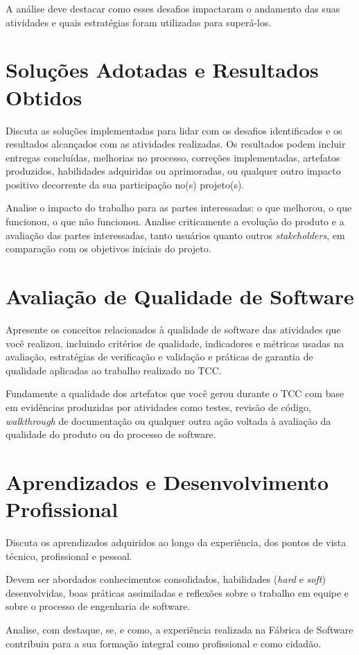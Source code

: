 A análise deve destacar como esses desafios impactaram o andamento das suas atividades e quais estratégias foram utilizadas para superá-los.

\section{Soluções Adotadas e Resultados Obtidos}

Discuta as soluções implementadas para lidar com os desafios identificados e os resultados alcançados com as atividades realizadas. 
Os resultados podem incluir entregas concluídas, melhorias no processo, correções implementadas, artefatos produzidos, habilidades adquiridas ou aprimoradas, ou qualquer outro impacto positivo decorrente da sua participação no(s) projeto(s).

Analise o impacto do trabalho para as partes interessadas: o que melhorou, o que funcionou, o que não funcionou.
Analise criticamente a evolução do produto e a avaliação das partes interessadas, tanto usuários quanto outros \textit{stakeholders}, em comparação com os objetivos iniciais do projeto.

\section{Avaliação de Qualidade de Software}

Apresente os conceitos relacionados à qualidade de software das atividades que você realizou, incluindo critérios de qualidade, indicadores e métricas usadas na avaliação, estratégias de verificação e validação e práticas de garantia de qualidade aplicadas ao trabalho realizado no TCC. 

Fundamente a qualidade dos artefatos que você gerou durante o TCC com base em evidências produzidas por atividades como testes, revisão de código, \textit{walkthrough} de documentação ou qualquer outra ação voltada à avaliação da qualidade do produto ou do processo de software.

\section{Aprendizados e Desenvolvimento Profissional}

Discuta os aprendizados adquiridos ao longo da experiência, dos pontos de vista técnico, profissional e pessoal. 

Devem ser abordados conhecimentos consolidados, habilidades (\textit{hard} e \textit{soft}) desenvolvidas, boas práticas assimiladas e reflexões sobre o trabalho em equipe e sobre o processo de engenharia de software. 

Analise, com destaque, se, e como, a experiência realizada na Fábrica de Software contribuiu para a sua formação integral como profissional e como cidadão.
